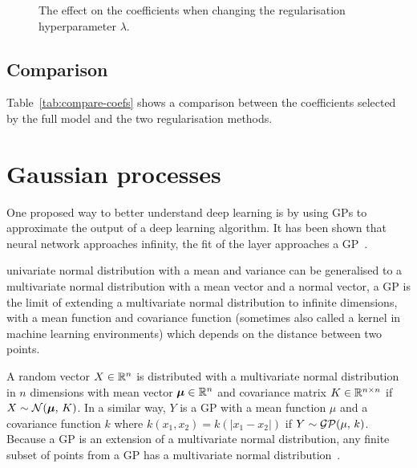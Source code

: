 \begin{figure}[htbp]
	\centering
	
	\caption{The effect on the coefficients when changing the regularisation hyperparameter \(\lambda\).}
	\label{fig:lasso-lambda}
\end{figure}


\subsection{Comparison}

Table~\ref{tab:compare-coefs} shows a comparison between the coefficients selected by the full model and the two regularisation methods.


\section{Gaussian processes}

One proposed way to better understand deep learning is by using \acp{GP} to approximate the output of a deep learning algorithm.
It has been shown that  neural network approaches infinity, the fit of the layer approaches a \ac{GP}~\autocite{neal1996}.

 univariate normal distribution with a mean and variance can be generalised to a multivariate normal distribution with a mean vector and a normal vector, a \ac{GP} is the limit of extending a multivariate normal distribution to infinite dimensions, with a mean function and covariance function (sometimes also called a kernel in machine learning environments) which depends on the distance between two points.

A random vector \(X \in \mathbb{R}{}^n\) is distributed with a multivariate normal distribution in \(n\) dimensions with mean vector \(\bm{\mu} \in \mathbb{R}{}^n\) and covariance matrix \(K \in \mathbb{R}^{n \times n}\) if \(X \sim \mathcal{N}(\bm{\mu},\, K)\).
In a similar way, \(Y\) is a \ac{GP} with a mean function \(\mu\) and a covariance function \(k\) where \(k(x_1, x_2) = k(\left|x_1 - x_2\right|)\) if \(Y \sim \mathcal{GP}(\mu,\, k)\).
Because a \ac{GP} is an extension of a multivariate normal distribution, any finite subset of points from a \ac{GP} has a multivariate normal distribution~\autocite[515]{williams1996}.


